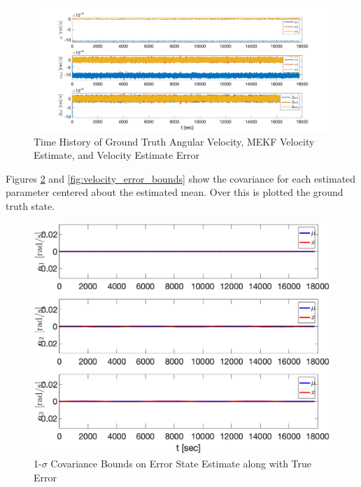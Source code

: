 \begin{figure}[H]
    \centering
    \captionsetup{ justification = centering}
    \includegraphics[width=12cm]{Images/PS10/mult_ext_kalman_filter_velocities.png}
    \caption{Time History of Ground Truth Angular Velocity, MEKF Velocity Estimate, and Velocity Estimate Error}
    \label{fig:mekf_velocity_and_error_history}
\end{figure}

Figures \ref{fig:attitude_error_bounds} and \ref{fig:velocity_error_bounds} show the covariance for each estimated parameter centered about the estimated mean. Over this is plotted the ground truth state.

\begin{figure}[H]
    \centering
    \captionsetup{ justification = centering}
    \includegraphics[width=12cm]{Images/PS10/mult_ext_kalman_filter_att_cov_bounds.png}
    \caption{1-$\sigma$ Covariance Bounds on Error State Estimate along with True Error}
    \label{fig:attitude_error_bounds}
\end{figure}

